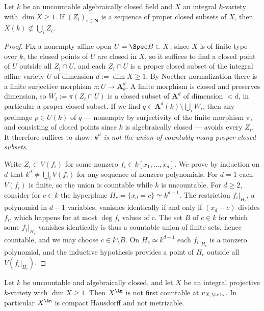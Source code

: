 \begin{lemma}
\label{lem:ch32-uncountable-field}
Let $k$ be an uncountable algebraically closed field and $X$ an integral
$k$-variety with $\dim X\geq1$.  If $(Z_i)_{i\in\mathbf N}$ is a
sequence of proper closed subsets of $X$, then
$X(k)\not\subset\bigcup_iZ_i$.
\end{lemma}

\begin{proof}
Fix a nonempty affine open $U=\Spec B\subset X$; since $X$ is of finite
type over $k$, the closed points of $U$ are closed in $X$, so it
suffices to find a closed point of $U$ outside all $Z_i\cap U$, and each
$Z_i\cap U$ is a proper closed subset of the integral affine variety
$U$ of dimension $d:=\dim X\geq1$.  By Noether normalization there is a
finite surjective morphism $\pi:U\to\mathbf A^d_k$.  A finite morphism is
closed and preserves dimension, so $W_i:=\pi(Z_i\cap U)$ is a closed
subset of $\mathbf A^d$ of dimension $<d$, in particular a proper closed
subset.  If we find $q\in\mathbf A^d(k)\setminus\bigcup_iW_i$, then any
preimage $p\in U(k)$ of $q$ --- nonempty by surjectivity of the finite
morphism $\pi$, and consisting of closed points since $k$ is
algebraically closed --- avoids every $Z_i$.  It therefore suffices to
show: \emph{$k^d$ is not the union of countably many proper closed
subsets}.

Write $Z_i\subset V(f_i)$ for some nonzero
$f_i\in k[x_1,\ldots,x_d]$.  We prove by induction on $d$ that
$k^d\neq\bigcup_iV(f_i)$ for any sequence of nonzero polynomials.  For
$d=1$ each $V(f_i)$ is finite, so the union is countable while $k$ is
uncountable.  For $d\geq2$, consider for $c\in k$ the hyperplane
$H_c=\{x_d=c\}\simeq k^{d-1}$.  The restriction $f_i|_{H_c}$, a
polynomial in $d-1$ variables, vanishes identically if and only if
$(x_d-c)$ divides $f_i$, which happens for at most $\deg f_i$ values
of $c$.  The set $B$ of $c\in k$ for which some $f_i|_{H_c}$ vanishes
identically is thus a countable union of finite sets, hence countable, and
we may choose $c\in k\setminus B$.  On $H_c\simeq k^{d-1}$ each
$f_i|_{H_c}$ is a nonzero polynomial, and the inductive hypothesis provides
a point of $H_c$ outside all $V(f_i|_{H_c})$.
\end{proof}

\begin{theorem}
\label{thm:ch32-not-first-countable}
Let $k$ be uncountable and algebraically closed, and let $X$ be an
integral projective $k$-variety with $\dim X\geq1$.  Then $X^{\An}$ is
not first countable at $v_{X,\triv}$.  In particular $X^{\An}$ is
compact Hausdorff and not metrizable.
\end{theorem}

